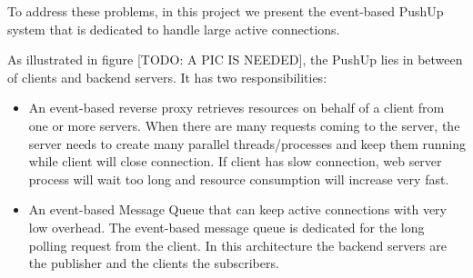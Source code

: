 To address these problems, in this project we present the event-based PushUp\cite{UnixBook} system that is dedicated to handle large active connections.

As illustrated in figure [TODO: A PIC IS NEEDED], the PushUp lies in between of clients and backend servers. It has two responsibilities:

\begin {itemize}
\item An event-based reverse proxy\cite{ReverseProxy} retrieves resources on behalf of a client from one or more servers. When there are many requests coming to the server, the server needs to create many parallel threads/processes and keep them running while client will close connection. If client has slow connection, web server process will wait too long and resource consumption will increase very fast.
\item An event-based Message Queue\cite{PubSub} that can keep active connections with very low overhead. The event-based message queue is dedicated for the long polling request from the client. In this architecture the backend servers are the publisher and the clients the subscribers.
\end {itemize}


